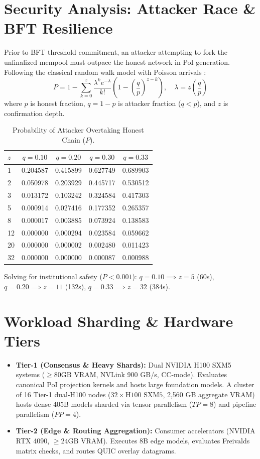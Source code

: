 \documentclass[10pt,twocolumn,letterpaper]{article}
\begin{document}
\section{Security Analysis: Attacker Race \& BFT Resilience}
Prior to BFT threshold commitment, an attacker attempting to fork the unfinalized mempool must outpace the honest network in PoI generation. Following the classical random walk model with Poisson arrivals \cite{nakamoto2008bitcoin, feller1957probability}:
\begin{equation}
P = 1 - \sum_{k=0}^z \frac{\lambda^k e^{-\lambda}}{k!} \left(1 - \left(\frac{q}{p}\right)^{z-k}\right), \quad \lambda = z \left(\frac{q}{p}\right)
\end{equation}
where $p$ is honest fraction, $q = 1 - p$ is attacker fraction ($q < p$), and $z$ is confirmation depth.

\begin{table}[htbp]
\centering
\small
\caption{Probability of Attacker Overtaking Honest Chain ($P$).}
\label{tab:security}
\begin{tabularx}{\columnwidth}{lcccc}
\toprule
$z$ & $q = 0.10$ & $q = 0.20$ & $q = 0.30$ & $q = 0.33$ \\
\midrule
1 & 0.204587 & 0.415899 & 0.627749 & 0.689903 \\
2 & 0.050978 & 0.203929 & 0.445717 & 0.530512 \\
3 & 0.013172 & 0.103242 & 0.324584 & 0.417303 \\
5 & 0.000914 & 0.027416 & 0.177352 & 0.265357 \\
8 & 0.000017 & 0.003885 & 0.073924 & 0.138583 \\
12 & 0.000000 & 0.000294 & 0.023584 & 0.059662 \\
20 & 0.000000 & 0.000002 & 0.002480 & 0.011423 \\
32 & 0.000000 & 0.000000 & 0.000087 & 0.000988 \\
\bottomrule
\end{tabularx}
\end{table}
Solving for institutional safety ($P < 0.001$): $q = 0.10 \implies z = 5$ (60s), $q = 0.20 \implies z = 11$ (132s), $q = 0.33 \implies z = 32$ (384s).

\section{Workload Sharding \& Hardware Tiers}
\begin{itemize}
    \item \textbf{Tier-1 (Consensus \& Heavy Shards):} Dual NVIDIA H100 SXM5 systems ($\ge 80\text{GB}$ VRAM, NVLink 900 GB/s, CC-mode). Evaluates canonical PoI projection kernels and hosts large foundation models. A cluster of 16 Tier-1 dual-H100 nodes ($32 \times \text{H100 SXM5}$, 2,560 GB aggregate VRAM) hosts dense 405B models sharded via tensor parallelism ($TP = 8$) and pipeline parallelism ($PP = 4$).
    \item \textbf{Tier-2 (Edge \& Routing Aggregation):} Consumer accelerators (NVIDIA RTX 4090, $\ge 24\text{GB}$ VRAM). Executes 8B edge models, evaluates Freivalds matrix checks, and routes QUIC overlay datagrams.
\end{itemize}
\end{document}
